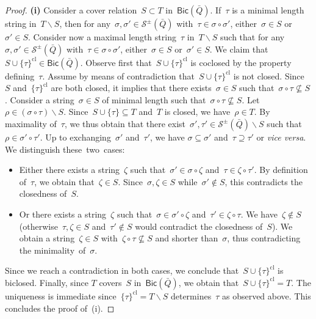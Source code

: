 \documentclass{amsart}
\theoremstyle{definition}
\newcommand{\ssm}{\smallsetminus} %
\newcommand{\viceversa}{\textit{vice versa}} %
\newcommand{\strings}{\mathcal{S}} %
\newcommand{\closure}[1]{#1^{\mathrm{cl}}} %
\newcommand{\Bicl}[1]{\mathsf{Bic}(#1)} %
\begin{document}
\begin{proof}
\medskip\noindent
{\bf (i)}
Consider a cover relation~$S \subset T$ in~$\Bicl{\bar Q}$.
If~$\tau$ is a minimal length string in~$T \ssm S$, then for any~$\sigma, \sigma' \in \strings^\pm(\bar Q)$ with~$\tau \in \sigma \circ \sigma'$, either~$\sigma \in S$ or~$\sigma' \in S$.
Consider now a maximal length string~$\tau$ in~$T \ssm S$ such that for any~$\sigma, \sigma' \in \strings^\pm(\bar Q)$ with~$\tau \in \sigma \circ \sigma'$, either~$\sigma \in S$ or~$\sigma' \in S$.
We claim that~$S \cup \closure{\{\tau\}} \in \Bicl{\bar Q}$.
Observe first that~$S \cup \closure{\{\tau\}}$ is coclosed by the property defining~$\tau$.
Assume by means of contradiction that~$S \cup \closure{\{\tau\}}$ is not closed.
Since~$S$ and~$\closure{\{\tau\}}$ are both closed, it implies that there exists~$\sigma \in S$ such that~$\sigma \circ \tau \not\subseteq S$.
Consider a string~$\sigma \in S$ of minimal length such that~$\sigma \circ \tau \not\subseteq S$.
Let~$\rho \in (\sigma \circ \tau) \ssm S$.
Since~$S \cup \{\tau\} \subseteq T$ and~$T$ is closed, we have~$\rho \in T$.
By maximality of~$\tau$, we thus obtain that there exist~$\sigma', \tau' \in \strings^\pm(\bar Q) \ssm S$ such that~$\rho \in \sigma' \circ \tau'$.
Up to exchanging~$\sigma'$ and~$\tau'$, we have $\sigma \subseteq \sigma'$ and~$\tau \supseteq \tau'$ or \viceversa.
We distinguish these~two~cases:
\begin{itemize}
\item Either there exists a string~$\zeta$ such that~$\sigma' \in \sigma \circ \zeta$ and~$\tau \in \zeta \circ \tau'$. By definition of~$\tau$, we obtain that~$\zeta \in S$. Since~$\sigma, \zeta \in S$ while~$\sigma' \notin S$, this contradicts the closedness of~$S$.
\item Or there exists a string~$\zeta$ such that~$\sigma \in \sigma' \circ \zeta$ and~$\tau' \in \zeta \circ \tau$. We have~$\zeta \notin S$ (otherwise~${\tau, \zeta \in S}$ and~$\tau' \notin S$ would contradict the closedness of~$S$). We obtain a string~$\zeta \in S$ with~$\zeta \circ \tau \not\subseteq S$ and shorter than~$\sigma$, thus contradicting the minimality~of~$\sigma$.
\end{itemize}
Since we reach a contradiction in both cases, we conclude that~$S \cup \closure{\{\tau\}}$ is biclosed.
Finally, since $T$ covers~$S$ in~$\Bicl{\bar Q}$, we obtain that~$S \cup \closure{\{\tau\}} = T$.
The uniqueness is immediate since~$\closure{\{\tau\}} = T \ssm S$ determines~$\tau$ as observed above.
This concludes the proof of~(i).


\end{proof}
\end{document}
